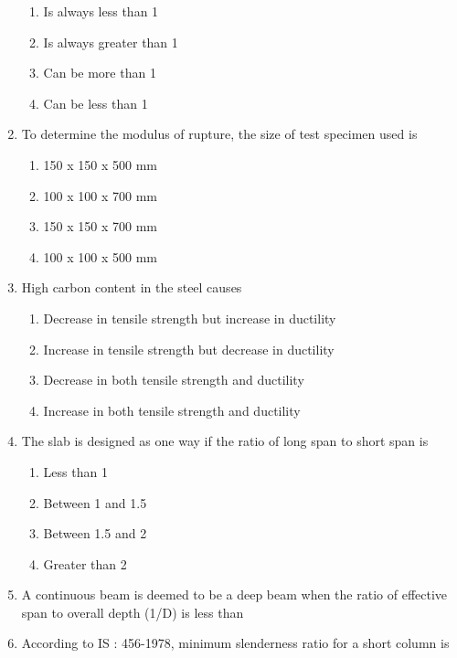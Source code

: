 \documentclass[11pt,a4paper]{article}
\begin{document}
\begin{enumerate}
{}
\begin{enumerate}[label=\Alph*.]
\item{Is always less than 1}
\item{Is always greater than 1}
\item{Can be more than 1}
\item{Can be less than 1}
\end{enumerate}
\item{To determine the modulus of rupture, the size of test specimen used is}
\begin{enumerate}[label=\Alph*.]
\item{150 x 150 x 500 mm}
\item{100 x 100 x 700 mm}
\item{150 x 150 x 700 mm}
\item{100 x 100 x 500 mm}
\end{enumerate}
\item{High carbon content in the steel causes}
\begin{enumerate}[label=\Alph*.]
\item{Decrease in tensile strength but increase in ductility}
\item{Increase in tensile strength but decrease in ductility}
\item{Decrease in both tensile strength and ductility}
\item{Increase in both tensile strength and ductility}
\end{enumerate}
\item{The slab is designed as one way if the ratio of long span to short span is}
\begin{enumerate}[label=\Alph*.]
\item{Less than 1}
\item{Between 1 and 1.5}
\item{Between 1.5 and 2}
\item{Greater than 2}
\end{enumerate}
\item{A continuous beam is deemed to be a deep beam when the ratio of effective span to overall depth (1/D) is less than}
\\
\item{According to IS : 456-1978, minimum slenderness ratio for a short column is}

\end{enumerate}
\end{document}
